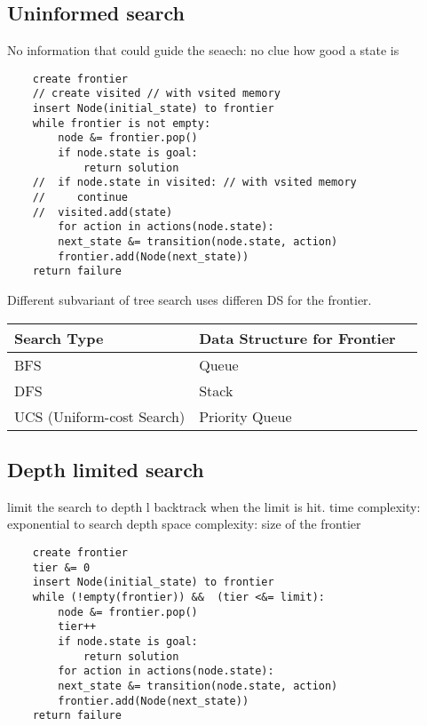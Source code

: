 \documentclass{article}
\begin{document}
\subsection*{Uninformed search} 
No information that could guide the seaech: no clue how good a state is
\begin{lstlisting}
    create frontier 
    // create visited // with vsited memory
    insert Node(initial_state) to frontier 
    while frontier is not empty: 
        node &= frontier.pop() 
        if node.state is goal: 
            return solution 
    //  if node.state in visited: // with vsited memory
    //     continue 
    //  visited.add(state)
        for action in actions(node.state): 
        next_state &= transition(node.state, action) 
        frontier.add(Node(next_state)) 
    return failure
\end{lstlisting}
Different subvariant of tree search uses differen DS for the frontier.\newline
\begin{tabular}{|l|l|l|}
    \hline
    \textbf{Search Type} & \textbf{Data Structure for Frontier}\\
    \hline
    BFS & Queue \\
    \hline
    DFS & Stack \\
    \hline
    UCS (Uniform-cost Search) & Priority Queue \\
    \hline
\end{tabular}

    
\subsection*{Depth limited search} 
limit the search to depth l \newline
backtrack when the limit is hit. \newline
time complexity: exponential to search depth \newline
space complexity: size of the frontier \newline
\begin{lstlisting}
    create frontier 
    tier &= 0
    insert Node(initial_state) to frontier 
    while (!empty(frontier)) &&  (tier <&= limit):
        node &= frontier.pop() 
        tier++
        if node.state is goal: 
            return solution 
        for action in actions(node.state): 
        next_state &= transition(node.state, action) 
        frontier.add(Node(next_state)) 
    return failure
\end{lstlisting}
\end{document}
